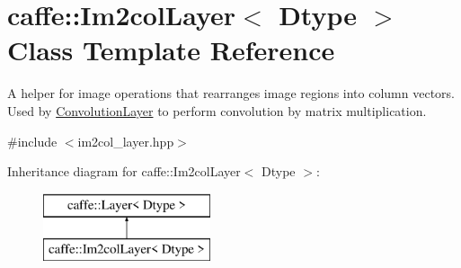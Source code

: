 \hypertarget{classcaffe_1_1Im2colLayer}{}\section{caffe\+:\+:Im2col\+Layer$<$ Dtype $>$ Class Template Reference}
\label{classcaffe_1_1Im2colLayer}


A helper for image operations that rearranges image regions into column vectors. Used by \hyperlink{classcaffe_1_1ConvolutionLayer}{Convolution\+Layer} to perform convolution by matrix multiplication.  




{\ttfamily \#include $<$im2col\+\_\+layer.\+hpp$>$}

Inheritance diagram for caffe\+:\+:Im2col\+Layer$<$ Dtype $>$\+:\begin{figure}[H]
\begin{center}
\leavevmode
\includegraphics[height=2.000000cm]{classcaffe_1_1Im2colLayer}
\end{center}
\end{figure}
